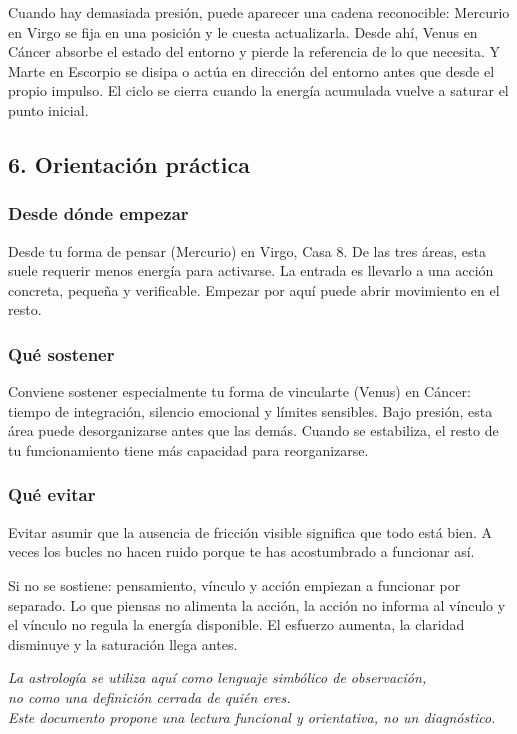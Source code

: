 \documentclass[11pt,a4paper]{article}
\begin{document}
Cuando hay demasiada presión, puede aparecer una cadena reconocible: Mercurio en Virgo se fija en una posición y le cuesta actualizarla. Desde ahí, Venus en Cáncer absorbe el estado del entorno y pierde la referencia de lo que necesita. Y Marte en Escorpio se disipa o actúa en dirección del entorno antes que desde el propio impulso. El ciclo se cierra cuando la energía acumulada vuelve a saturar el punto inicial.

\vspace{0.8cm}

\subsection{6. Orientación práctica}

\subsubsection*{Desde dónde empezar}

\justifying
Desde tu forma de pensar (Mercurio) en Virgo, Casa 8. De las tres áreas, esta suele requerir menos energía para activarse. La entrada es llevarlo a una acción concreta, pequeña y verificable. Empezar por aquí puede abrir movimiento en el resto.

\subsubsection*{Qué sostener}

\justifying
Conviene sostener especialmente tu forma de vincularte (Venus) en Cáncer: tiempo de integración, silencio emocional y límites sensibles. Bajo presión, esta área puede desorganizarse antes que las demás. Cuando se estabiliza, el resto de tu funcionamiento tiene más capacidad para reorganizarse.

\subsubsection*{Qué evitar}

\justifying
Evitar asumir que la ausencia de fricción visible significa que todo está bien. A veces los bucles no hacen ruido porque te has acostumbrado a funcionar así.

\vspace{0.6cm}

\justifying
Si no se sostiene: pensamiento, vínculo y acción empiezan a funcionar por separado. Lo que piensas no alimenta la acción, la acción no informa al vínculo y el vínculo no regula la energía disponible. El esfuerzo aumenta, la claridad disminuye y la saturación llega antes.

\vspace{1.2cm}

\begin{center}
{\small\itshape\color{grisai}
La astrología se utiliza aquí como lenguaje simbólico de observación,\\
no como una definición cerrada de quién eres.\\[0.2cm]
Este documento propone una lectura funcional y orientativa, no un diagnóstico.
}
\end{center}
\end{document}
